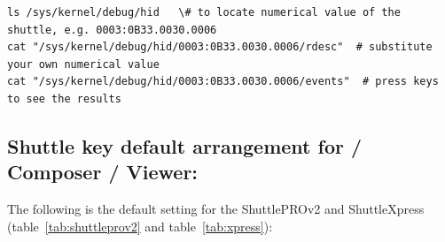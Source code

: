 \begin{lstlisting}[style=sh]
ls /sys/kernel/debug/hid   \# to locate numerical value of the shuttle, e.g. 0003:0B33.0030.0006
cat "/sys/kernel/debug/hid/0003:0B33.0030.0006/rdesc"  # substitute your own numerical value
cat "/sys/kernel/debug/hid/0003:0B33.0030.0006/events"  # press keys to see the results
\end{lstlisting}

\subsection{Shuttle key default arrangement for \CGG{} / Composer / Viewer:}%
\label{sub:shuttle_key_default_cinelerra}

The following is the default setting for the ShuttlePROv2 and
ShuttleXpress (table~\ref{tab:shuttleprov2} and
table~\ref{tab:xpress}):

